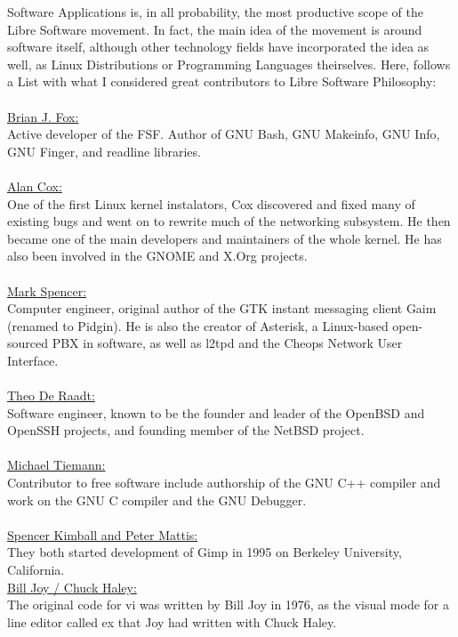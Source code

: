 \documentclass[10pt, a4paper, oneside]{report}
\begin{document}
Software Applications is, in all probability, the most productive scope of the Libre Software movement. In fact, the main idea of the movement is around software itself, although other technology fields have incorporated the idea as well, as Linux Distributions or Programming Languages theirselves.
Here, follows a List with what I considered great contributors to Libre Software Philosophy:\\
\\
\underline{Brian J. Fox:}\\
Active developer of the FSF. Author of GNU Bash, GNU Makeinfo, GNU Info, GNU Finger, and readline libraries.\\
\\
\underline{Alan Cox:}\\
One of the first Linux kernel instalators, Cox discovered and fixed many of existing bugs and went on to rewrite much of the networking subsystem. 
He then became one of the main developers and maintainers of the whole kernel.
He has also been involved in the GNOME and X.Org projects.\\
\\
\underline{Mark Spencer:}\\
Computer engineer, original author of the GTK instant messaging client Gaim (renamed to Pidgin).
He is also the creator of Asterisk, a Linux-based open-sourced PBX in software, as well as l2tpd and the Cheops Network User Interface.\\
\\
\underline{Theo De Raadt:}\\
Software engineer, known to be the founder and leader of the OpenBSD and OpenSSH projects, and founding member of the NetBSD project.\\
\\
\underline{Michael Tiemann:}\\
Contributor to free software include authorship of the GNU C++ compiler and work on the GNU C compiler and the GNU Debugger.\\
\\
\underline{Spencer Kimball and Peter Mattis:}\\
They both started development of Gimp in 1995 on Berkeley University, California.\\
\newpage
{\noindent}\underline{Bill Joy / Chuck Haley:}\\
The original code for vi was written by Bill Joy in 1976, as the visual mode for a line editor called ex that Joy had written with Chuck Haley.\\ 
\end{document}
